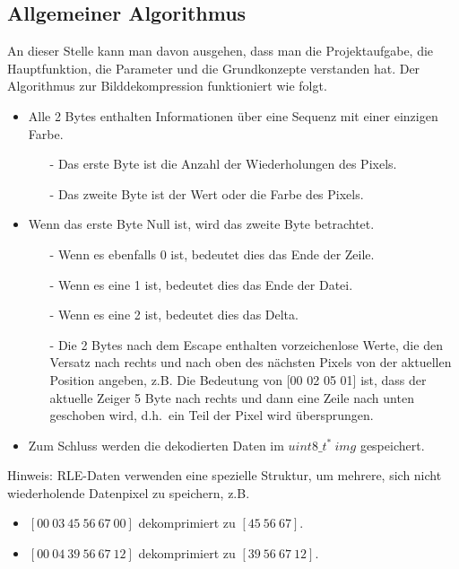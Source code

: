 \documentclass[course=erap]{aspdoc}
\begin{document}
    \subsection{Allgemeiner Algorithmus}\label{subsec:allgemeiner-algorithmus}
    An dieser Stelle kann man davon ausgehen, dass man die Projektaufgabe, die Hauptfunktion, die Parameter
    und die Grundkonzepte verstanden hat.
    \newline
    \newline
    Der Algorithmus zur Bilddekompression funktioniert wie folgt. \ \cite{bitmapCompression}
    \begin{itemize}
        \item Alle 2 Bytes enthalten Informationen über eine Sequenz mit einer einzigen Farbe.
        \begin{itemize}
            \item[-] Das erste Byte ist die Anzahl der Wiederholungen des Pixels.
            \item[-] Das zweite Byte ist der Wert oder die Farbe des Pixels.
        \end{itemize}
        \item Wenn das erste Byte Null ist, wird das zweite Byte betrachtet.
        \begin{itemize}
            \item[-] Wenn es ebenfalls 0 ist, bedeutet dies das Ende der Zeile.
            \item[-] Wenn es eine 1 ist, bedeutet dies das Ende der Datei.
            \item[-] Wenn es eine 2 ist, bedeutet dies das Delta.
            \item[-] Die 2 Bytes nach dem Escape enthalten vorzeichenlose Werte, die den Versatz nach rechts und nach
            oben des nächsten Pixels von der aktuellen Position angeben, z.B\@.
            \newline
            Die Bedeutung von [00 02 05 01] ist, dass der aktuelle Zeiger 5 Byte nach rechts und dann eine Zeile nach
            unten geschoben wird, d.h.\ ein Teil der Pixel wird übersprungen.
        \end{itemize}

        \item Zum Schluss werden die dekodierten Daten im $uint8\_t^* \ img$ gespeichert.
    \end{itemize}
    \noindent Hinweis: RLE-Daten verwenden eine spezielle Struktur, um mehrere, sich nicht wiederholende
    Datenpixel zu speichern, z.B\@.
    \begin{itemize}
        \item $[00 \ 03 \ 45 \ 56 \ 67 \ 00]$ dekomprimiert zu $[45 \ 56 \ 67]$.
        \item $[00 \ 04 \ 39 \ 56 \ 67 \ 12]$ dekomprimiert zu $[39 \ 56 \ 67 \ 12]$.
        \noindent
    \end{itemize}
\end{document}

